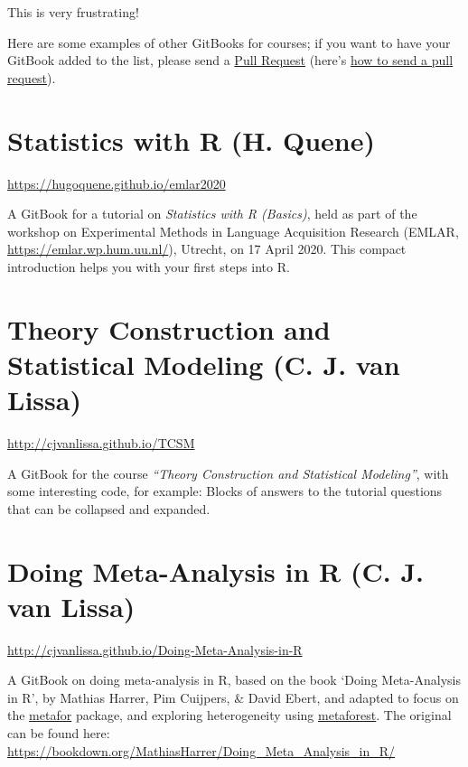 \documentclass[
]{book}
\begin{document}
This is very frustrating!

Here are some examples of other GitBooks for courses; if you want to have your GitBook added to the list, please send a \href{https://github.com/cjvanlissa/gitbook-demo/pulls}{Pull Request} (here's \href{https://help.github.com/en/github/collaborating-with-issues-and-pull-requests/creating-a-pull-request}{how to send a pull request}).

\hypertarget{statistics-with-r-h.-quene}{%
\section{Statistics with R (H. Quene)}\label{statistics-with-r-h.-quene}}

\url{https://hugoquene.github.io/emlar2020}

A GitBook for a tutorial on \emph{Statistics with R (Basics)}, held as part of the workshop on Experimental Methods in Language Acquisition Research (EMLAR, \url{https://emlar.wp.hum.uu.nl/}), Utrecht, on 17 April 2020. This compact introduction helps you with your first steps into R.

\hypertarget{theory-construction-and-statistical-modeling-c.-j.-van-lissa}{%
\section{Theory Construction and Statistical Modeling (C. J. van Lissa)}\label{theory-construction-and-statistical-modeling-c.-j.-van-lissa}}

\url{http://cjvanlissa.github.io/TCSM}

A GitBook for the course \emph{``Theory Construction and Statistical Modeling''}, with some interesting code, for example: Blocks of answers to the tutorial questions that can be collapsed and expanded.

\hypertarget{doing-meta-analysis-in-r-c.-j.-van-lissa}{%
\section{Doing Meta-Analysis in R (C. J. van Lissa)}\label{doing-meta-analysis-in-r-c.-j.-van-lissa}}

\url{http://cjvanlissa.github.io/Doing-Meta-Analysis-in-R}

A GitBook on doing meta-analysis in R, based on the book `Doing Meta-Analysis in R', by Mathias Harrer, Pim Cuijpers, \& David Ebert, and adapted to focus on the \href{https://cran.r-project.org/web/packages/metafor/index.html}{metafor} package, and exploring heterogeneity using \href{https://cran.r-project.org/web/packages/metaforest/index.html}{metaforest}. The original can be found here: \url{https://bookdown.org/MathiasHarrer/Doing_Meta_Analysis_in_R/}
\end{document}
